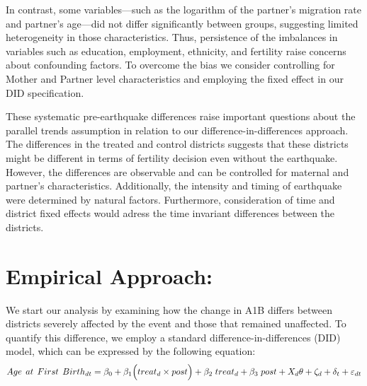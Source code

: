 \documentclass[11pt,a4paper]{article}
\begin{document}
In contrast, some variables—such as the logarithm of the partner’s migration rate and partner’s age—did not differ significantly between groups, suggesting limited heterogeneity in those characteristics. Thus, persistence of the imbalances in variables such as education, employment, ethnicity, and fertility raise concerns about confounding factors. To overcome the bias we consider controlling for Mother and Partner level characteristics and employing the fixed effect in our DID specification.


\vspace{0.25 cm}

These systematic pre-earthquake differences raise important questions about the parallel trends assumption in relation to our difference-in-differences approach. The differences in the treated and control districts suggests that these districts might be different in terms of fertility decision even without the earthquake. However, the differences are observable and can be controlled for maternal and partner's characteristics. Additionally, the intensity and timing of earthquake were determined by natural factors. Furthermore, consideration of time and district fixed effects would adress the time invariant differences between the districts.

\vspace{0.25cm}

\section{Empirical Approach: }


We start our analysis by examining how the change in A1B differs between districts severely affected by the event and those that remained unaffected. To quantify this difference, we employ a standard difference-in-differences (DID) model, which can be expressed by the following equation:
\begin{equation}
Age \hspace{0.15 cm} at \hspace{0.15 cm} First \hspace{0.15 cm} Birth_{dt} = \beta_{0} + \beta_{1} \Big(treat_{d} \times post \Big) + \beta_{2} \hspace{0.1 cm} treat_{d} + \beta_{3} \hspace{0.1 cm} post + X_{d}\theta  + \zeta_{d} + \delta_{t} + \varepsilon_{dt}    
\end{equation}
\end{document}

